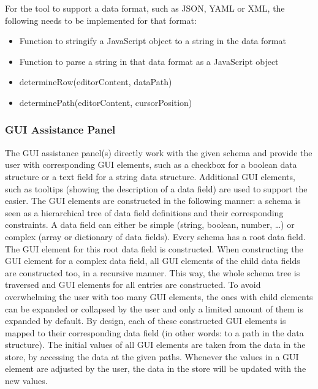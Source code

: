 For the tool to support a data format, such as JSON, YAML or XML, the following needs to be implemented for that format:
\begin{itemize}
	\item Function to stringify a JavaScript object to a string in the data format
	\item Function to parse a string in that data format as a JavaScript object
	\item determineRow(editorContent, dataPath)
	\item determinePath(editorContent, cursorPosition)
\end{itemize}


\subsubsection{GUI Assistance Panel}
The GUI assistance panel(s) directly work with the given schema and provide the user with corresponding GUI elements, such as a checkbox for a boolean data structure or a text field for a string data structure.
Additional GUI elements, such as tooltips (showing the description of a data field) are used to support the easier.
The GUI elements are constructed in the following manner: a schema is seen as a hierarchical tree of data field definitions and their corresponding constraints.
A data field can either be simple (string, boolean, number, \ldots) or complex (array or dictionary of data fields).
Every schema has a root data field.
The GUI element for this root data field is constructed. %
When constructing the GUI element for a complex data field, all GUI elements of the child data fields are constructed too, in a recursive manner.
This way, the whole schema tree is traversed and GUI elements for all entries are constructed.
To avoid overwhelming the user with too many GUI elements, the ones with child elements can be expanded or collapsed by the user and only a limited amount of them is expanded by default.
By design, each of these constructed GUI elements is mapped to their corresponding data field (in other words: to a path in the data structure).
The initial values of all GUI elements are taken from the data in the store, by accessing the data at the given paths.
Whenever the values in a GUI element are adjusted by the user, the data in the store will be updated with the new values.


